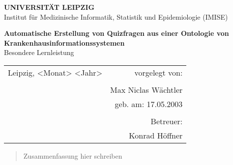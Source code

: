 \documentclass[headsepline,titlepage,ngerman,twoside,12pt]{report}
\author{Max Niclas Wächtler}
\newcommand\todo[1]{}%
\begin{document}
\begin{acronym}
\end{acronym}
\allowdisplaybreaks%

\onehalfspace

\begin{titlepage}
\thispagestyle{empty}
\begin{center}

{\large\bf UNIVERSITÄT LEIPZIG\\[1mm]}
Institut für Medizinische Informatik, Statistik und Epidemiologie (IMISE)

\vspace*{4cm}

{\Huge\textbf{Automatische Erstellung von Quizfragen aus einer Ontologie von Krankenhausinformationssystemen}\\}
\vspace{0.5cm}
{\large Besondere Lernleistung}\\
\vspace{2cm}
\todo{15--20 Seiten. Zwei Möglichkeiten:\\
(1) Vergleich, Zusammenfassung und \textbf{eigene} Bewertung zweier wissenschaftlicher Paper.\\
(2) Nutzenbewertung eines wissenschaftlichen Papers hinsichtlich einer konkreten Forschungssituation
}

\vspace*{4cm}

\begin{tabularx}{\textwidth}{lr}
Leipzig, <Monat> <Jahr>		&vorgelegt von:\\
\\
				&\makeatletter Max Niclas Wächtler \makeatother\\
				&geb. am: 17.05.2003\\
\\
				&Betreuer:\\
				&Konrad Höffner\\
\end{tabularx}
\vspace{1cm}

\end{center}
\end{titlepage}
\newpage
\begin{abstract}
Zusammenfassung hier schreiben
\end{abstract}
\tableofcontents
\newpage
\end{document}
